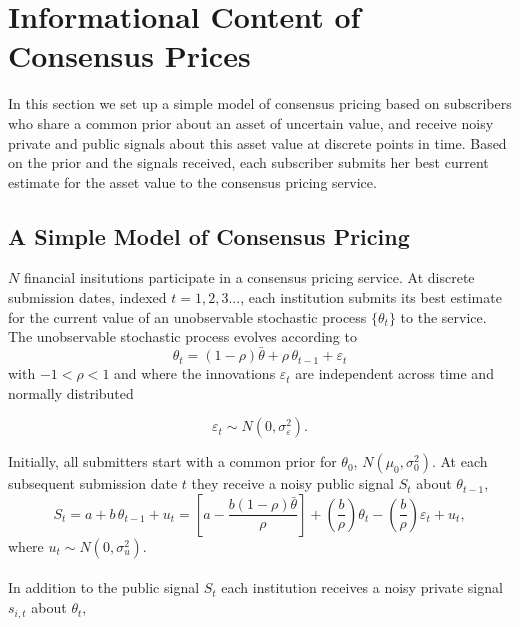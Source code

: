 \documentclass[a4,12pt]{article}
\begin{document}

\section{Informational Content of Consensus Prices}
\label{Section:Theory} 
In this section we set up a simple model of consensus pricing based on subscribers who share a common prior about an asset of uncertain value, and receive noisy private and public signals about this asset value at discrete points in time. Based on the prior and the signals received, each subscriber submits her best current estimate for the asset value to the consensus pricing service.

\subsection{A Simple Model of Consensus Pricing} 

$N$ financial insitutions participate in a consensus pricing service. At discrete submission dates, indexed $t=1,2,3...$, each institution submits its best estimate for the current value of an unobservable stochastic process $\{ \theta_t \}$ to the service. The unobservable stochastic process evolves according to
\[ \theta_t = (1-\rho) \bar{\theta} + \rho \, \theta_{t-1} + \varepsilon_t \] 
with $-1 < \rho < 1$ and where the innovations $\varepsilon_t$ are independent across time and normally distributed

\[ \varepsilon_t \sim N \left(0,\sigma_\varepsilon^2 \right). \]

Initially, all submitters start with a common prior for $\theta_0$, $N(\mu_0,\sigma^2_0)$. At each subsequent submission date $t$ they receive a noisy public signal $S_t$ about $\theta_{t-1}$,
\[ S_t = a + b \, \theta_{t-1} + u_t = \left[a - \frac{b (1-\rho) \bar{\theta}}{\rho} \right] + \left( \frac{b}{\rho} \right) \theta_{t} - \left( \frac{b}{\rho} \right) \varepsilon_t + u_t,  \]
where $u_t \sim N(0,\sigma_u^2)$.\\
\\
In addition to the public signal $S_t$ each institution receives a noisy private signal $s_{i,t}$ about $\theta_t$,
\end{document}
